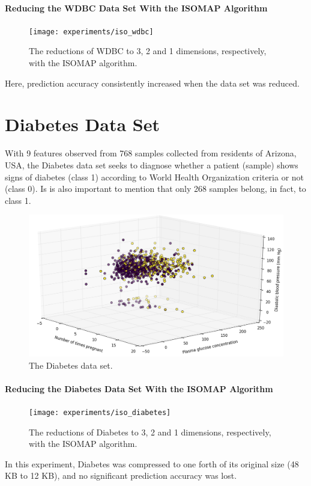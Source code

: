 \newpage
\paragraph{Reducing the WDBC Data Set With the ISOMAP Algorithm}

\begin{figure}[H]
	\centering
	\captionsetup{justification=centering}
	\texttt{[image: experiments/iso\_wdbc]}
	\caption{The reductions of WDBC to 3, 2 and 1 dimensions, respectively, with the ISOMAP algorithm.}
	\label{fig:dswdbciso}
\end{figure}

Here, prediction accuracy consistently increased when the data set was reduced.

\newpage
\section{Diabetes Data Set}

With 9 features observed from 768 samples collected from residents of Arizona, USA, the Diabetes data set seeks to diagnose whether a patient (sample) shows signs of diabetes (class 1) according to World Health Organization criteria or not (class 0). Is is also important to mention that only 268 samples belong, in fact, to class 1.

\begin{figure}[H]
	\centering
	\includegraphics[width=\linewidth]{img/datasets/diabetes}
	\captionsetup{justification=centering}
	\caption{The Diabetes data set.}
	\label{fig:dsdiabetes}
\end{figure}

\newpage
\paragraph{Reducing the Diabetes Data Set With the ISOMAP Algorithm}

\begin{figure}[H]
	\centering
	\captionsetup{justification=centering}
	\texttt{[image: experiments/iso\_diabetes]}
	\caption{The reductions of Diabetes to 3, 2 and 1 dimensions, respectively, with the ISOMAP algorithm.}
	\label{fig:dsdiabetesiso}
\end{figure}

In this experiment, Diabetes was compressed to one forth of its original size (48 KB to 12 KB), and no significant prediction accuracy was lost.
